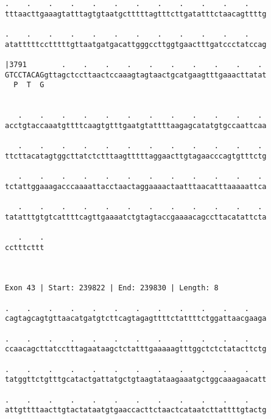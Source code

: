 \documentclass{article}
\begin{document}
\begin{Verbatim}
.    .    .    .    .    .    .    .    .    .    .    .    
tttaacttgaaagtatttagtgtaatgctttttagtttcttgatatttctaacagttttg
                                                            
.    .    .    .    .    .    .    .    .    .    .    .    
atatttttcctttttgttaatgatgacattgggccttggtgaactttgatccctatccag
                                                            
|3791        .    .    .    .    .    .    .    .    .    . 
GTCCTACAGgttagctccttaactccaaagtagtaactgcatgaagtttgaaacttatat
  P  T  G                                                   
                                                            
  
   .    .    .    .    .    .    .    .    .    .    .    . 
acctgtaccaaatgttttcaagtgtttgaatgtattttaagagcatatgtgccaattcaa
                                                            
   .    .    .    .    .    .    .    .    .    .    .    . 
ttcttacatagtggcttatctctttaagtttttaggaacttgtagaacccagtgtttctg
                                                            
   .    .    .    .    .    .    .    .    .    .    .    . 
tctattggaaagacccaaaattacctaactaggaaaactaatttaacatttaaaaattca
                                                            
   .    .    .    .    .    .    .    .    .    .    .    . 
tatatttgtgtcattttcagttgaaaatctgtagtaccgaaaacagccttacatattcta
                                                            
   .    .
cctttcttt
         
         
 
Exon 43 | Start: 239822 | End: 239830 | Length: 8
 
.    .    .    .    .    .    .    .    .    .    .    .    
cagtagcagtgttaacatgatgtcttcagtagagttttctattttctggattaacgaaga
                                                            
.    .    .    .    .    .    .    .    .    .    .    .    
ccaacagcttatcctttagaataagctctatttgaaaaagtttggctctctatacttctg
                                                            
.    .    .    .    .    .    .    .    .    .    .    .    
tatggttctgtttgcatactgattatgctgtaagtataagaaatgctggcaaagaacatt
                                                            
.    .    .    .    .    .    .    .    .    .    .    .    
attgttttaacttgtactataatgtgaaccacttctaactcataatcttattttgtactg
                                                            

\end{Verbatim}
\end{document}
